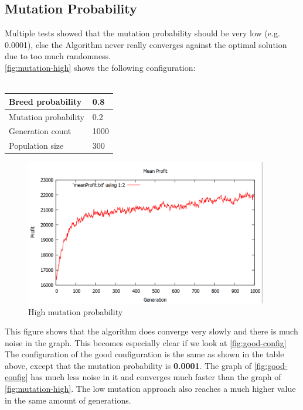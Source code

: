 \documentclass[fontsize=12pt,toc=bibliography, notitlepage]{scrreprt}
\begin{document}
\subsection{Mutation Probability}
\label{subsec:mutation-probability}
Multiple tests showed that the mutation probability should be very low (e.g. 0.0001), else the Algorithm never really converges against the optimal solution due to too much randomness.\\
\autoref{fig:mutation-high} shows the following configuration:\\ \\
\begin{tabular}{ |l|l| }
	\hline
	Breed probability & 0.8 \\ \hline
	Mutation probability & 0.2 \\ \hline
	Generation count & 1000 \\ \hline
	Population size & 300 \\ \hline
\end{tabular}
\begin{figure}[H]
	\centering
	\includegraphics[width=400px]{images/mutation-high.png}
	\caption{High mutation probability}
	\label{fig:mutation-high}
\end{figure}
This figure shows that the algorithm does converge very slowly and there is much noise in the graph. This becomes especially clear if we look at \autoref{fig:good-config}
The configuration of the good configuration is the same as shown in the table above, except that the mutation probability is \textbf{0.0001}. The graph of \autoref{fig:good-config} has much less noise in it and converges much faster than the graph of \autoref{fig:mutation-high}. The low mutation approach also reaches a much higher value in the same amount of generations.
\end{document}

